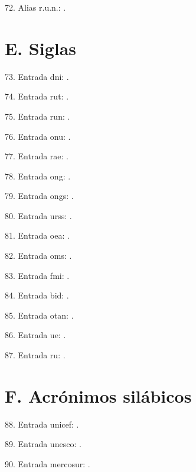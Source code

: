 \documentclass{article}
\begin{document}
72. Alias r.u.n.: .

\section*{E. Siglas}

73. Entrada dni: .

74. Entrada rut: .

75. Entrada run: .

76. Entrada onu: .

77. Entrada rae: .

78. Entrada ong: .

79. Entrada ongs: .

80. Entrada urss: .

81. Entrada oea: .

82. Entrada oms: .

83. Entrada fmi: .

84. Entrada bid: .

85. Entrada otan: .

86. Entrada ue: .

87. Entrada ru: .

\section*{F. Acrónimos silábicos}

88. Entrada unicef: .

89. Entrada unesco: .

90. Entrada mercosur: .
\end{document}
